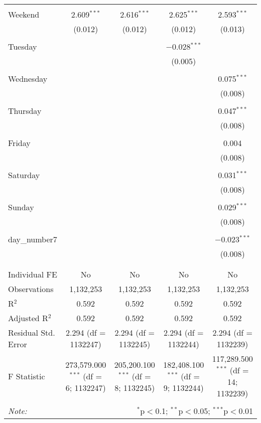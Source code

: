 \documentclass[
]{article}
\begin{document}
\begin{table}[!htbp]
{\begin{tabular}{@{\extracolsep{5pt}}lcccc}
  & & & & \\ 
 Weekend & 2.609$^{***}$ & 2.616$^{***}$ & 2.625$^{***}$ & 2.593$^{***}$ \\ 
  & (0.012) & (0.012) & (0.012) & (0.013) \\ 
  & & & & \\ 
 Tuesday &  &  & $-$0.028$^{***}$ &  \\ 
  &  &  & (0.005) &  \\ 
  & & & & \\ 
 Wednesday &  &  &  & 0.075$^{***}$ \\ 
  &  &  &  & (0.008) \\ 
  & & & & \\ 
 Thursday &  &  &  & 0.047$^{***}$ \\ 
  &  &  &  & (0.008) \\ 
  & & & & \\ 
 Friday &  &  &  & 0.004 \\ 
  &  &  &  & (0.008) \\ 
  & & & & \\ 
 Saturday &  &  &  & 0.031$^{***}$ \\ 
  &  &  &  & (0.008) \\ 
  & & & & \\ 
 Sunday &  &  &  & 0.029$^{***}$ \\ 
  &  &  &  & (0.008) \\ 
  & & & & \\ 
 day\_number7 &  &  &  & $-$0.023$^{***}$ \\ 
  &  &  &  & (0.008) \\ 
  & & & & \\ 
\hline \\[-1.8ex] 
Individual FE & No & No & No & No \\ 
Observations & 1,132,253 & 1,132,253 & 1,132,253 & 1,132,253 \\ 
R$^{2}$ & 0.592 & 0.592 & 0.592 & 0.592 \\ 
Adjusted R$^{2}$ & 0.592 & 0.592 & 0.592 & 0.592 \\ 
Residual Std. Error & 2.294 (df = 1132247) & 2.294 (df = 1132245) & 2.294 (df = 1132244) & 2.294 (df = 1132239) \\ 
F Statistic & 273,579.000$^{***}$ (df = 6; 1132247) & 205,200.100$^{***}$ (df = 8; 1132245) & 182,408.100$^{***}$ (df = 9; 1132244) & 117,289.500$^{***}$ (df = 14; 1132239) \\ 
\hline 
\hline \\[-1.8ex] 
\textit{Note:}  & \multicolumn{4}{r}{$^{*}$p$<$0.1; $^{**}$p$<$0.05; $^{***}$p$<$0.01} \\ 
\end{tabular}
} 
\end{table} 
\newpage
\end{document}
